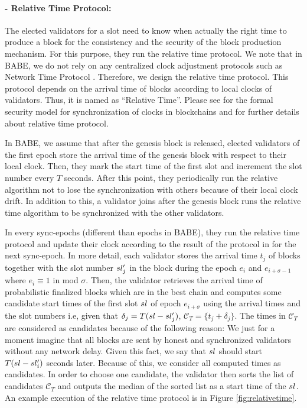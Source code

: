 


\paragraph{- Relative Time Protocol:}



The elected validators for a slot need to know  when actually the right time to produce a block for the consistency and the security of the block production mechanism. For this purpose, they run the relative time protocol. We note that in BABE, we do not rely on any centralized clock adjustment protocols such as Network Time Protocol \cite{ntp}. Therefore, we design the relative time protocol. This protocol depends on the arrival time of blocks according to local clocks of validators. Thus, it is named as ``Relative Time''.
Please see \cite{consensusonclock} for the formal security model for synchronization of clocks in blockchains and for further details about relative time protocol. 

In BABE, we assume that after the genesis block is released, elected validators of the first epoch store the arrival time of the genesis block with respect to their local clock. Then, they mark the start time of the first slot and increment the slot number every $ T $ seconds. After this point,  they periodically run the relative algorithm not to lose the synchronization with others because of their local clock drift.  In addition to this, a validator joins after the genesis block runs the relative time algorithm to be synchronized with the other validators.

In every sync-epochs (different than epochs in BABE), they run the relative time protocol and update their clock according to the result of the protocol in for the next sync-epoch. 
In more detail, each validator  stores  the arrival time $ t_j $ of  blocks together with the slot number $sl'_j$ in the block during the epoch $ e_i $ and $ e_{i+\sigma-1} $ where $ e_i \equiv 1 $ in mod $ \sigma $. Then, the validator retrieves the arrival time of probabilistic finalized blocks which are in the best chain and computes some candidate start times of the first slot $ sl $ of epoch $e_{i+\sigma}$ using the arrival times and the slot numbers i.e,  given that $ \delta_j = T(sl - sl'_j)  $,  $\mathcal{C}_T = \{t_j+\delta_j \}$. The times in $ \mathcal{C}_T $ are considered as candidates because of the following reason: We just for a moment imagine that  all  blocks are sent by honest and synchronized validators without any network delay. Given this fact, we say that $ sl $ should start $ T(sl - sl'_i) $ seconds later. Because of this,  we consider all computed times as  candidates. In order to  choose one candidate,  the validator then sorts the list of candidates $ \mathcal{C}_T $ and outputs the median of the sorted list as a start time of the $ sl $. An example execution of the relative time protocol is in Figure \ref{fig:relativetime}.

